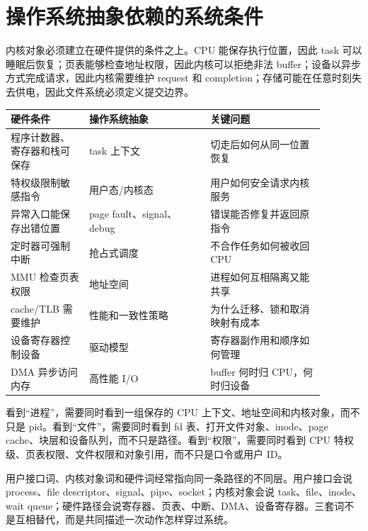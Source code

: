 \section{操作系统抽象依赖的系统条件}

内核对象必须建立在硬件提供的条件之上。CPU 能保存执行位置，因此 task 可以睡眠后恢复；页表能够检查地址权限，因此内核可以拒绝非法 buffer；设备以异步方式完成请求，因此内核需要维护 request 和 completion；存储可能在任意时刻失去供电，因此文件系统必须定义提交边界。

\begin{longtable}{|p{0.22\linewidth}|p{0.34\linewidth}|p{0.32\linewidth}|}
\toprule
硬件条件 & 操作系统抽象 & 关键问题 \\
\midrule
程序计数器、寄存器和栈可保存 & task 上下文 & 切走后如何从同一位置恢复 \\\tablerowrule
特权级限制敏感指令 & 用户态/内核态 & 用户如何安全请求内核服务 \\\tablerowrule
异常入口能保存出错位置 & page fault、signal、debug & 错误能否修复并返回原指令 \\\tablerowrule
定时器可强制中断 & 抢占式调度 & 不合作任务如何被收回 CPU \\\tablerowrule
MMU 检查页表权限 & 地址空间 & 进程如何互相隔离又能共享 \\\tablerowrule
cache/TLB 需要维护 & 性能和一致性策略 & 为什么迁移、锁和取消映射有成本 \\\tablerowrule
设备寄存器控制设备 & 驱动模型 & 寄存器副作用和顺序如何管理 \\\tablerowrule
DMA 异步访问内存 & 高性能 I/O & buffer 何时归 CPU，何时归设备 \\
\bottomrule
\end{longtable}

看到“进程”，需要同时看到一组保存的 CPU 上下文、地址空间和内核对象，而不只是 pid。看到“文件”，需要同时看到 fd 表、打开文件对象、inode、page cache、块层和设备队列，而不只是路径。看到“权限”，需要同时看到 CPU 特权级、页表权限、文件权限和对象引用，而不只是口令或用户 ID。

用户接口词、内核对象词和硬件词经常指向同一条路径的不同层。用户接口会说 process、file descriptor、signal、pipe、socket；内核对象会说 task、file、inode、wait queue；硬件路径会说寄存器、页表、中断、DMA、设备寄存器。三套词不是互相替代，而是共同描述一次动作怎样穿过系统。


